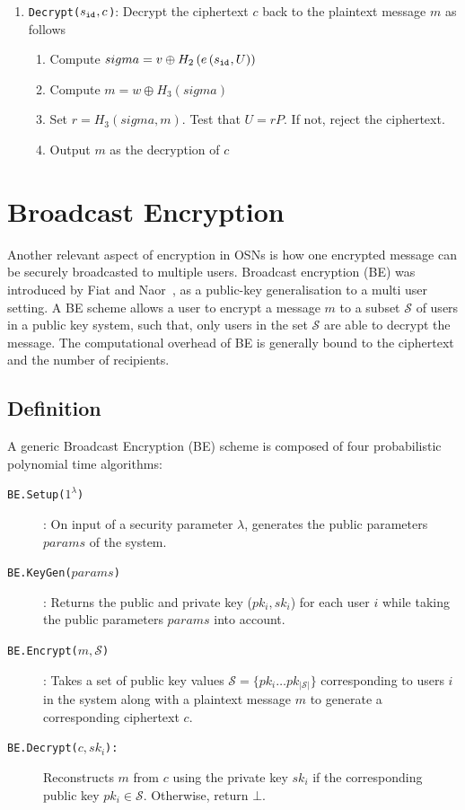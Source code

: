 \begin{algorithm}
\begin{enumerate}
\begin{enumerate}
   \end{enumerate}
   \item \texttt{Decrypt($s_{\mathtt{id}_{}}, c$)}: Decrypt the ciphertext $c$ back to the plaintext message $m$ as follows
   \begin{enumerate}
    \item Compute $sigma = v \oplus H_2 \left( e \left( s_{\mathtt{id}_{}}, U \right) \right)$
    \item Compute $m = w \oplus H_3 \left( sigma \right)$
    \item Set $r = H_3 \left( sigma, m \right)$. Test that $U = rP$. If not, reject the ciphertext.
    \item Output $m$ as the decryption of $c$
    \end{enumerate}
 \end{enumerate}
\end{algorithm}



\section{Broadcast Encryption}
Another relevant aspect of encryption in OSNs is how one encrypted message can be securely broadcasted to multiple users. Broadcast encryption (BE) was introduced by Fiat and Naor~\cite{art:FiatN93}, as a public-key generalisation to a multi user setting. A BE scheme allows a user to encrypt a message $m$ to a subset $\mathcal{S}$ of users in a public key system, such that, only users in the set $\mathcal{S}$ are able to decrypt the message. The computational overhead of BE is generally bound to the ciphertext and the number of recipients.

\subsection{Definition}
A generic Broadcast Encryption (BE) scheme is composed of four probabilistic polynomial time algorithms:

\begin{description}
    \item[\texttt{BE.Setup($1^{\lambda}$)}]: On input of a security parameter $\lambda$, generates the public parameters $params$ of the system.
    \item[\texttt{BE.KeyGen($params$)}]: Returns the public and private key ($pk_i,sk_i$) for each user $i$ while taking the public parameters $params$ into account.
    \item[\texttt{BE.Encrypt($m, \mathcal{S}$)}]: Takes a set of public key values $\mathcal{S}=\{pk_i \ldots pk_{|\mathcal{S}|}\}$ corresponding to users $i$ in the system along with a plaintext message $m$ to generate a corresponding ciphertext $c$.
    \item[\texttt{BE.Decrypt($c, sk_i$):}] Reconstructs $m$ from $c$ using the private key $sk_i$ if the corresponding public key $pk_i \in \mathcal{S}$. Otherwise, return $\bot$.
\end{description}

